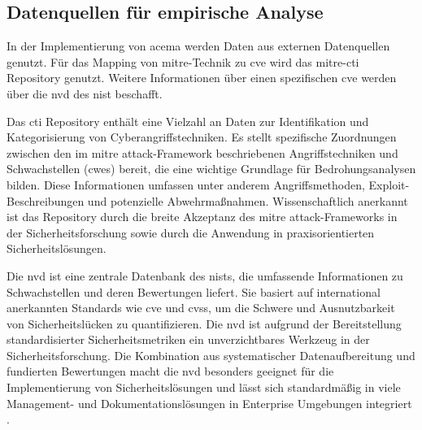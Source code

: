 \subsection{Datenquellen für empirische Analyse}
\par In der Implementierung von \gls{acema} werden Daten aus externen Datenquellen genutzt. Für das Mapping von \gls{mitre}-Technik zu \gls{cve} wird das \gls{mitre}-\gls{cti} Repository genutzt. Weitere Informationen über einen spezifischen \gls{cve} werden über die \gls{nvd} des \gls{nist} beschafft.
\par Das \gls{cti} Repository enthält eine Vielzahl an Daten zur Identifikation und Kategorisierung von Cyberangriffstechniken. Es stellt spezifische Zuordnungen zwischen den im \gls{mitre} \gls{attack}-Framework beschriebenen Angriffstechniken und Schwachstellen (\glspl{cwe}) bereit, die eine wichtige Grundlage für Bedrohungsanalysen bilden. Diese Informationen umfassen unter anderem Angriffsmethoden, Exploit-Beschreibungen und potenzielle Abwehrmaßnahmen. Wissenschaftlich anerkannt ist das Repository durch die breite Akzeptanz des \gls{mitre} \gls{attack}-Frameworks in der Sicherheitsforschung sowie durch die Anwendung in praxisorientierten Sicherheitslösungen.
\par Die \gls{nvd} ist eine zentrale Datenbank des \gls{nist}s, die umfassende Informationen zu Schwachstellen und deren Bewertungen liefert. Sie basiert auf international anerkannten Standards wie \gls{cve} und \gls{cvss}, um die Schwere und Ausnutzbarkeit von Sicherheitslücken zu quantifizieren. Die \gls{nvd} ist aufgrund der Bereitstellung standardisierter Sicherheitsmetriken ein unverzichtbares Werkzeug in der Sicherheitsforschung. Die Kombination aus systematischer Datenaufbereitung und fundierten Bewertungen macht die \gls{nvd} besonders geeignet für die Implementierung von Sicherheitslösungen und lässt sich standardmäßig in viele Management- und Dokumentationslösungen in Enterprise Umgebungen integriert \autocite{AssetsNVDIntegration,InformationenNVDIntegrationen}.
